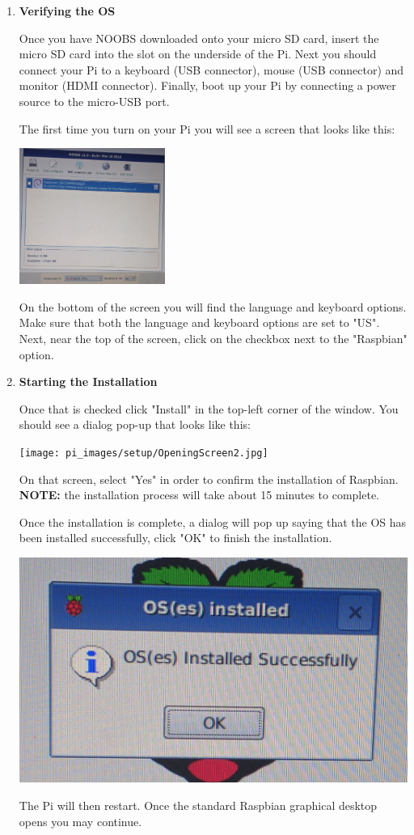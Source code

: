 \begin{enumerate}
	\item \textbf{Verifying the OS}

Once you have NOOBS downloaded onto your micro SD card, insert the micro SD card into the slot on the underside of the Pi. Next you should connect your Pi to a keyboard (USB connector), mouse (USB connector) and monitor (HDMI connector). Finally, boot up your Pi by connecting a power source to the micro-USB port. 

The first time you turn on your Pi you will see a screen that looks like this:

\beforefig
\centerline{\includegraphics[height=1.75in]{pi_images/setup/OpeningScreen1.jpg}}
\afterfig

On the bottom of the screen you will find the language and keyboard options. Make sure that both the language and keyboard options are set to "US". Next, near the top of the screen, click on the checkbox next to the "Raspbian" option.

\item \textbf{Starting the Installation}

Once that is checked click "Install" in the top-left corner of the window. You should see a dialog pop-up that looks like this:

\beforefig
\centerline{\texttt{[image: pi\_images/setup/OpeningScreen2.jpg]}}
\afterfig

On that screen, select "Yes" in order to confirm the installation of Raspbian. \textbf{NOTE:} the installation process will take about 15 minutes to complete.

Once the installation is complete, a dialog will pop up saying that the OS has been installed successfully, click "OK" to finish the installation. 

\beforefig
\centerline{\includegraphics[height=1	in]{pi_images/setup/OpeningScreen3.jpg}}
\afterfig

The Pi will then restart. Once the standard Raspbian graphical desktop opens you may continue.

\end{enumerate}

